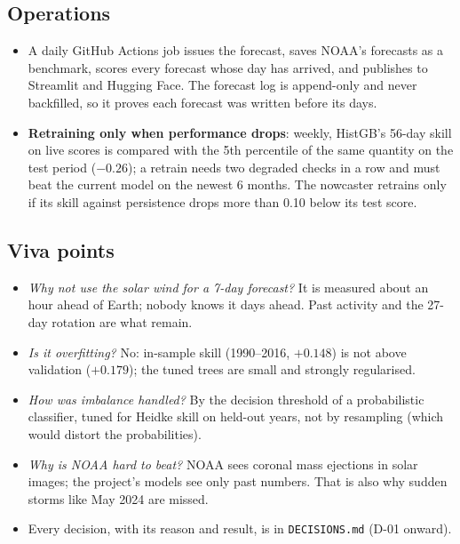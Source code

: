 \documentclass[11pt,a4paper]{article}
\begin{document}
\subsection{Operations}
\begin{itemize}[leftmargin=*]
\item A daily GitHub Actions job issues the forecast, saves NOAA's forecasts as a benchmark, scores every
forecast whose day has arrived, and publishes to Streamlit and Hugging Face. The forecast log is append-only and
never backfilled, so it proves each forecast was written before its days.
\item \textbf{Retraining only when performance drops}: weekly, HistGB's 56-day skill on live scores is compared with
the 5th percentile of the same quantity on the test period ($-0.26$); a retrain needs two degraded checks in a
row and must beat the current model on the newest 6 months. The nowcaster retrains only if its skill against
persistence drops more than 0.10 below its test score.
\end{itemize}

\subsection{Viva points}
\begin{itemize}[leftmargin=*]
\item \emph{Why not use the solar wind for a 7-day forecast?} It is measured about an hour ahead of Earth; nobody
knows it days ahead. Past activity and the 27-day rotation are what remain.
\item \emph{Is it overfitting?} No: in-sample skill (1990--2016, $+0.148$) is not above validation ($+0.179$); the
tuned trees are small and strongly regularised.
\item \emph{How was imbalance handled?} By the decision threshold of a probabilistic classifier, tuned for Heidke
skill on held-out years, not by resampling (which would distort the probabilities).
\item \emph{Why is NOAA hard to beat?} NOAA sees coronal mass ejections in solar images; the project's models see
only past numbers. That is also why sudden storms like May 2024 are missed.
\item Every decision, with its reason and result, is in \texttt{DECISIONS.md} (D-01 onward).
\end{itemize}
\end{document}

